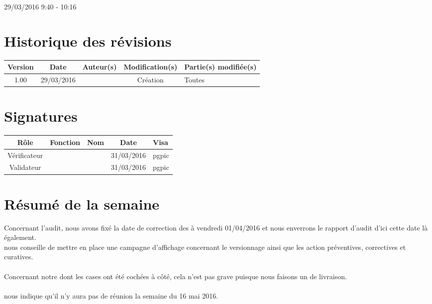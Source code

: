 \documentclass [a4paper] {article}
\begin{document}
\rhead{}

29/03/2016
\hfill   
\hfill 	9:40 - 10:16 				%



\section*{Historique des révisions}
\begin{center}
			\begin{tabular}{| c | c | c | c | p{4cm} |}
				\hline
				\rowcolor{Gray}
				Version & Date & Auteur(s) & Modification(s) & Partie(s) modifiée(s)		 \\
				\hline
				1.00 & 29/03/2016 & \Pierre & Création & Toutes \\
		\hline		
			\end{tabular}
		\end{center}

\section*{Signatures}

		\begin{center}
			\begin{tabular}{| c | c | c | c | p{4cm} |}
				\hline
				\rowcolor{Gray}
				Rôle & Fonction & Nom & Date & Visa		 \\
				\hline
				Vérificateur & \RQA & \Kafui & 31/03/2016 & pgpic \\[30pt]
				\hline
				Validateur & \CP & \Sergi & 31/03/2016 & pgpic \\[30pt]	
				\hline
			\end{tabular}
		\end{center}


\section{Résumé de la semaine}

Concernant l'audit, nous avons fixé la date de correction des \FT{} à vendredi 01/04/2016 et nous enverrons le rapport d'audit d'ici cette date là également. \\
\nomTuteurQualite{} nous conseille de mettre en place une campagne d'affichage concernant le versionnage ainsi que les action préventives, correctives et curatives. \\ ~ \\

Concernant notre \CDR{} dont les cases ont été cochées à côté, cela n'est pas grave puisque nous faisons un \PV{} de livraison. \\ ~ \\

\nomTuteurQualite{} nous indique qu'il n'y aura pas de réunion la semaine du 16 mai 2016.
\end{document}
